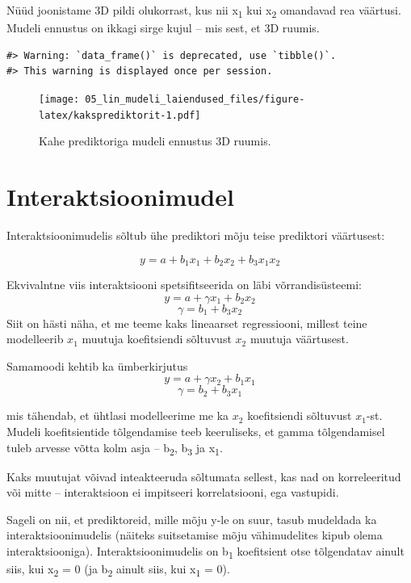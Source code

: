 \documentclass[]{book}
\begin{document}
Nüüd joonistame 3D pildi olukorrast, kus nii x\textsubscript{1} kui
x\textsubscript{2} omandavad rea väärtusi. Mudeli ennustus on ikkagi
sirge kujul -- mis sest, et 3D ruumis.



\begin{verbatim}
#> Warning: `data_frame()` is deprecated, use `tibble()`.
#> This warning is displayed once per session.
\end{verbatim}

\begin{figure}
\centering
\texttt{[image: 05\_lin\_mudeli\_laiendused\_files/figure-latex/kaksprediktorit-1.pdf]}
\caption{\label{fig:kaksprediktorit}Kahe prediktoriga mudeli ennustus 3D ruumis.}
\end{figure}

\section{Interaktsioonimudel}\label{interaktsioonimudel}

Interaktsioonimudelis sõltub ühe prediktori mõju teise prediktori
väärtusest:

\[y = a + b_1x_1 + b_2x_2 + b_3x_1x_2\]

Ekvivalntne viis interaktsiooni spetsifitseerida on läbi
võrrandisüsteemi: \[y = a + \gamma x_1 + b_2x_2\]
\[\gamma = b_1 + b_3x_2\] Siit on hästi näha, et me teeme kaks
lineaarset regressiooni, millest teine modelleerib \(x_1\) muutuja
koefitsiendi sõltuvust \(x_2\) muutuja väärtusest.

Samamoodi kehtib ka ümberkirjutus \[y = a + \gamma x_2 + b_1x_1\]
\[\gamma = b_2 + b_3x_1\]

mis tähendab, et ühtlasi modelleerime me ka \(x_2\) koefitsiendi
sõltuvust \(x_1\)-st. Mudeli koefitsientide tõlgendamise teeb
keeruliseks, et gamma tõlgendamisel tuleb arvesse võtta kolm asja --
b\textsubscript{2}, b\textsubscript{3} ja x\textsubscript{1}.

Kaks muutujat võivad inteakteeruda sõltumata sellest, kas nad on
korreleeritud või mitte -- interaktsioon ei impitseeri korrelatsiooni,
ega vastupidi.

Sageli on nii, et prediktoreid, mille mõju y-le on suur, tasub mudeldada
ka interaktsioonimudelis (näiteks suitsetamise mõju vähimudelites kipub
olema interaktsiooniga). Interaktsioonimudelis on b\textsubscript{1}
koefitsient otse tõlgendatav ainult siis, kui x\textsubscript{2} = 0 (ja
b\textsubscript{2} ainult siis, kui x\textsubscript{1} = 0).
\end{document}
